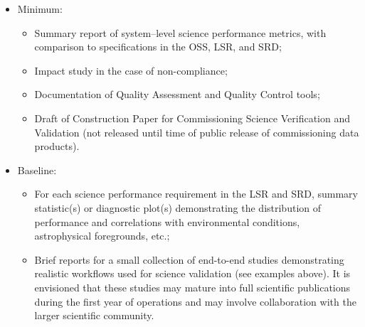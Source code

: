 \begin{itemize}

	\item Minimum:
		\begin{itemize}
			\item Summary report of system--level science performance metrics, with comparison to specifications in the OSS, LSR, and SRD;
			\item Impact study in the case of non-compliance;
			\item Documentation of Quality Assessment and Quality Control tools;
			\item Draft of Construction Paper for Commissioning Science Verification and Validation (not released until time of public release of commissioning data products).
		\end{itemize}
		
	\item Baseline:
		\begin{itemize}
			\item For each science performance requirement in the LSR and SRD, summary statistic(s) or diagnostic plot(s) demonstrating the distribution of performance and correlations with environmental conditions, astrophysical foregrounds, etc.;
			\item Brief reports for a small collection of end-to-end studies demonstrating realistic workflows used for science validation (see examples above). It is envisioned that these studies may mature into full scientific publications during the first year of operations and may involve collaboration with the larger scientific community.
		\end{itemize}
		
	\end{itemize}






